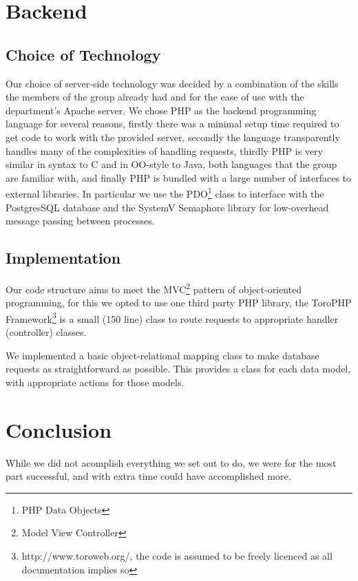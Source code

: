 \documentclass[12pt]{amsart}
\begin{document}
\section{Backend}
  \subsection{Choice of Technology}
    \begin{flushleft}
      Our choice of server-side technology was decided by a combination of the
      skills the members of the group already had and for the ease of use with
      the department's Apache server. We chose PHP as the backend programming
      language for several reasons, firstly there was a minimal setup time
      required to get code to work with the provided server, secondly the
      language transparently handles many of the complexities of handling
      requests, thirdly PHP is very similar in syntax to C and in OO-style to
      Java, both languages that the group are familiar with, and finally PHP is
      bundled with a large number of interfaces to external libraries.  In
      particular we use the PDO\footnote{PHP Data Objects} class to interface
      with the PostgresSQL database and the SystemV Semaphore library for
      low-overhead message passing between processes.
    \end{flushleft}

  \subsection{Implementation}
    \begin{flushleft}
      Our code structure aims to meet the MVC\footnote{Model View Controller} 
      pattern of object-oriented programming, for this we opted to use one third 
      party PHP library, the ToroPHP Framework\footnote{http://www.toroweb.org/, 
      the code is assumed to be freely licenced as all documentation implies so} 
      is a small (150 line) class to route requests to appropriate handler 
      (controller) classes.

      We implemented a basic object-relational mapping class to make database 
      requests as straightforward as possible. This provides a class for each 
      data model, with appropriate actions for those models.
    \end{flushleft}

\section{Conclusion}
  \begin{flushleft}
    While we did not acomplish everything we set out to do, we were for the
    most part successful, and with extra time could have accomplished more. 
  \end{flushleft}
\end{document}
